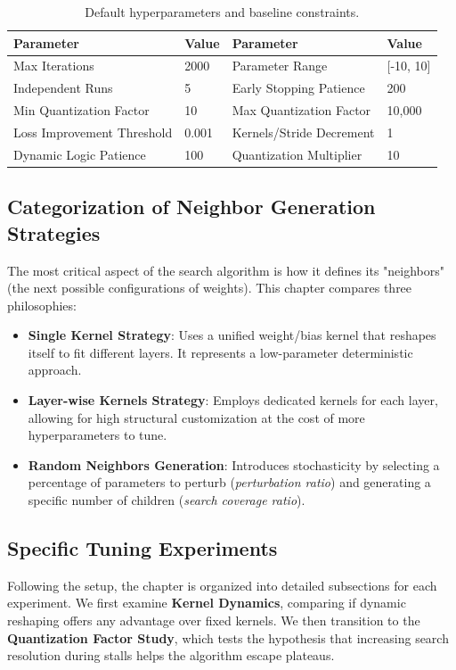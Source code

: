 \begin{table}[htbp]
\centering
\caption{Default hyperparameters and baseline constraints.}
\label{tab:default_params}
\begin{tabular}{ll|ll}
\hline
\textbf{Parameter} & \textbf{Value} & \textbf{Parameter} & \textbf{Value} \\ \hline
Max Iterations & 2000 & Parameter Range & [-10, 10] \\
Independent Runs & 5 & Early Stopping Patience & 200 \\
Min Quantization Factor & 10 & Max Quantization Factor & 10,000 \\
Loss Improvement Threshold & 0.001 & Kernels/Stride Decrement & 1 \\
Dynamic Logic Patience & 100 & Quantization Multiplier & 10 \\ \hline
\end{tabular}
\end{table}

\subsection{Categorization of Neighbor Generation Strategies}
The most critical aspect of the search algorithm is how it defines its "neighbors" (the next possible configurations of weights). This chapter compares three philosophies:
\begin{itemize}
    \item \textbf{Single Kernel Strategy}: Uses a unified weight/bias kernel that reshapes itself to fit different layers. It represents a low-parameter deterministic approach.
    \item \textbf{Layer-wise Kernels Strategy}: Employs dedicated kernels for each layer, allowing for high structural customization at the cost of more hyperparameters to tune.
    \item \textbf{Random Neighbors Generation}: Introduces stochasticity by selecting a percentage of parameters to perturb (\textit{perturbation ratio}) and generating a specific number of children (\textit{search coverage ratio}).
\end{itemize}

\subsection{Specific Tuning Experiments}
Following the setup, the chapter is organized into detailed subsections for each experiment. We first examine \textbf{Kernel Dynamics}, comparing if dynamic reshaping offers any advantage over fixed kernels. We then transition to the \textbf{Quantization Factor Study}, which tests the hypothesis that increasing search resolution during stalls helps the algorithm escape plateaus. 


